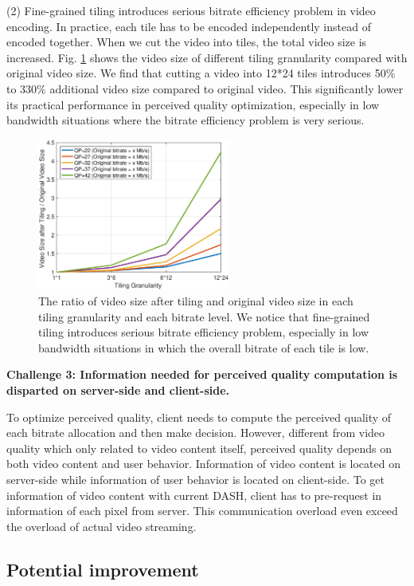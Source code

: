 (2) Fine-grained tiling introduces serious bitrate efficiency problem in video encoding. In practice, each tile has to be encoded independently instead of encoded together. When we cut the video into tiles, the total video size is increased. Fig. \ref{bitrateefficiency} shows the video size of different tiling granularity compared with original video size. We find that cutting a video into 12*24 tiles introduces 50\% to 330\% additional video size compared to original video. This significantly lower its practical performance in perceived quality optimization, especially in low bandwidth situations where the bitrate efficiency problem is very serious.

\begin{figure}
  \centering
  \includegraphics[width=2.5in]{images/bitrateefficiency.eps}
  \caption{The ratio of video size after tiling and original video size in each tiling granularity and each bitrate level. We notice that fine-grained tiling introduces serious bitrate efficiency problem, especially in low bandwidth situations in which the overall bitrate of each tile is low.}
  \label{bitrateefficiency}
  \end{figure}

\textbf{Challenge 3: Information needed for perceived quality computation is disparted on server-side and client-side.} 

To optimize perceived quality, client needs to compute the perceived quality of each bitrate allocation and then make decision. However, different from video quality which only related to video content itself, perceived quality depends on both video content and user behavior. Information of video content is located on server-side while information of user behavior is located on client-side. To get information of video content with current DASH, client has to pre-request in information of each pixel from server. This communication overload even exceed the overload of actual video streaming.

\subsection{Potential improvement}

